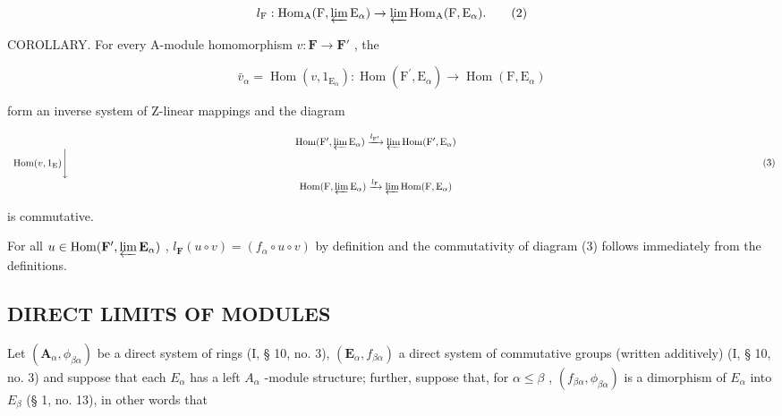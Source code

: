 \[
l _ {\mathrm{F}}: \operatorname{Hom} _ {\mathrm{A}} (\mathrm{F}, \varprojlim \mathrm{E} _ {\alpha}) \rightarrow \varprojlim \operatorname{Hom} _ {\mathrm{A}} (\mathrm{F}, \mathrm{E} _ {\alpha}).\tag{2}
\]

COROLLARY. For every A-module homomorphism \(v: \mathbf{F} \to \mathbf{F}'\) , the

\[
\bar {v} _ {\alpha} = \operatorname{Hom} (v, 1 _ {\mathrm{E} _ {\alpha}}): \operatorname{Hom} (\mathrm{F} ^ {\prime}, \mathrm{E} _ {\alpha}) \rightarrow \operatorname{Hom} (\mathrm{F}, \mathrm{E} _ {\alpha})
\]

form an inverse system of Z-linear mappings and the diagram

\[
\begin{array}{c} \operatorname{Hom} (\mathrm{F} ^ {\prime}, \varprojlim \mathrm{E} _ {\alpha}) \xrightarrow {l _ {\mathrm{F} ^ {\prime}}} \varprojlim \operatorname{Hom} (\mathrm{F} ^ {\prime}, \mathrm{E} _ {\alpha}) \\ \operatorname{Hom} (v, 1 _ {\mathrm{E}}) \Biggl \downarrow \qquad \qquad \qquad \qquad \qquad \qquad \qquad \qquad \qquad \qquad \qquad \qquad \qquad \qquad \qquad \qquad \qquad \qquad \qquad \qquad \qquad \qquad \qquad \qquad \qquad \qquad \qquad \qquad \qquad \qquad \qquad \qquad \qquad \qquad \\ \operatorname{Hom} (\mathrm{F}, \varprojlim \mathrm{E} _ {\alpha}) \xrightarrow {l _ {\mathrm{F}}} \varprojlim \operatorname{Hom} (\mathrm{F}, \mathrm{E} _ {\alpha}) \end{array}\tag{3}
\]

is commutative.

For all \(u \in \operatorname{Hom}(\mathbf{F}', \varprojlim \mathbf{E}_{\alpha})\) , \(l_{\mathbf{F}}(u \circ v) = (f_{\alpha} \circ u \circ v)\) by definition and the commutativity of diagram (3) follows immediately from the definitions.

\subsection{DIRECT LIMITS OF MODULES}


Let \((\mathbf{A}_{\alpha}, \phi_{\beta\alpha})\) be a direct system of rings (I, § 10, no. 3), \((\mathbf{E}_{\alpha}, f_{\beta\alpha})\) a direct system of commutative groups (written additively) (I, § 10, no. 3) and suppose that each \(E_{\alpha}\) has a left \(A_{\alpha}\) -module structure; further, suppose that, for \(\alpha \leqslant \beta\) , \((f_{\beta\alpha}, \phi_{\beta\alpha})\) is a dimorphism of \(E_{\alpha}\) into \(E_{\beta}\) (§ 1, no. 13), in other words that

